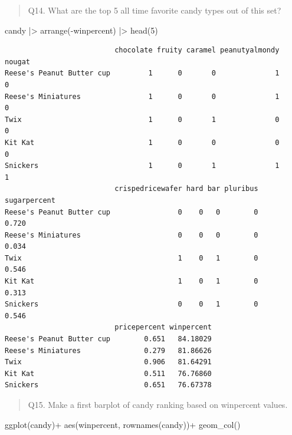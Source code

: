 \documentclass[
  letterpaper,
  DIV=11,
  numbers=noendperiod]{scrartcl}
\newenvironment{Shaded}{\begin{snugshade}}{\end{snugshade}}
\newcommand{\DecValTok}[1]{\textcolor[rgb]{0.68,0.00,0.00}{#1}}
\newcommand{\FunctionTok}[1]{\textcolor[rgb]{0.28,0.35,0.67}{#1}}
\newcommand{\NormalTok}[1]{\textcolor[rgb]{0.00,0.23,0.31}{#1}}
\newcommand{\SpecialCharTok}[1]{\textcolor[rgb]{0.37,0.37,0.37}{#1}}
\begin{document}
\begin{quote}
Q14. What are the top 5 all time favorite candy types out of this set?
\end{quote}

\begin{Shaded}
\begin{Highlighting}[]
\NormalTok{candy }\SpecialCharTok{|\textgreater{}}
  \FunctionTok{arrange}\NormalTok{(}\SpecialCharTok{{-}}\NormalTok{winpercent) }\SpecialCharTok{|\textgreater{}}
  \FunctionTok{head}\NormalTok{(}\DecValTok{5}\NormalTok{)}
\end{Highlighting}
\end{Shaded}

\begin{verbatim}
                          chocolate fruity caramel peanutyalmondy nougat
Reese's Peanut Butter cup         1      0       0              1      0
Reese's Miniatures                1      0       0              1      0
Twix                              1      0       1              0      0
Kit Kat                           1      0       0              0      0
Snickers                          1      0       1              1      1
                          crispedricewafer hard bar pluribus sugarpercent
Reese's Peanut Butter cup                0    0   0        0        0.720
Reese's Miniatures                       0    0   0        0        0.034
Twix                                     1    0   1        0        0.546
Kit Kat                                  1    0   1        0        0.313
Snickers                                 0    0   1        0        0.546
                          pricepercent winpercent
Reese's Peanut Butter cup        0.651   84.18029
Reese's Miniatures               0.279   81.86626
Twix                             0.906   81.64291
Kit Kat                          0.511   76.76860
Snickers                         0.651   76.67378
\end{verbatim}

\begin{quote}
Q15. Make a first barplot of candy ranking based on winpercent values.
\end{quote}

\begin{Shaded}
\begin{Highlighting}[]
\FunctionTok{ggplot}\NormalTok{(candy)}\SpecialCharTok{+}
  \FunctionTok{aes}\NormalTok{(winpercent, }\FunctionTok{rownames}\NormalTok{(candy))}\SpecialCharTok{+}
  \FunctionTok{geom\_col}\NormalTok{()}
\end{Highlighting}
\end{Shaded}
\end{document}
